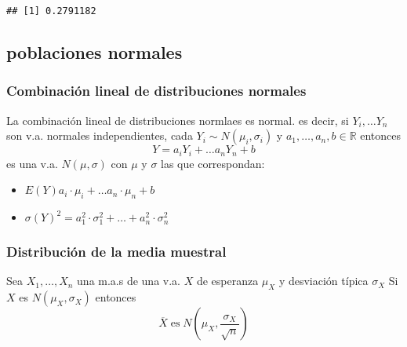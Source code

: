 \documentclass[
]{article}
\newenvironment{Shaded}{\begin{snugshade}}{\end{snugshade}}
\newcommand{\DecValTok}[1]{\textcolor[rgb]{0.00,0.00,0.81}{#1}}
\newcommand{\FunctionTok}[1]{\textcolor[rgb]{0.00,0.00,0.00}{#1}}
\newcommand{\NormalTok}[1]{#1}
\newcommand{\SpecialCharTok}[1]{\textcolor[rgb]{0.00,0.00,0.00}{#1}}
\begin{document}
\begin{Shaded}
\end{Shaded}

\begin{verbatim}
## [1] 0.2791182
\end{verbatim}

\hypertarget{poblaciones-normales}{%
\subsection{poblaciones normales}\label{poblaciones-normales}}

\hypertarget{combinaciuxf3n-lineal-de-distribuciones-normales}{%
\subsubsection{Combinación lineal de distribuciones
normales}\label{combinaciuxf3n-lineal-de-distribuciones-normales}}

La combinación lineal de distribuciones normlaes es normal. es decir, si
\(Y_i,\ldots Y_n\) son v.a. normales independientes, cada
\(Y_i \sim N(\mu_i,\sigma_i)\) y \(a_1,\ldots, a_n, b\in \mathbb{R}\)
entonces \[Y=a_iY_i + \ldots a_nY_n + b\] es una v.a. \(N(\mu,\sigma)\)
con \(\mu\) y \(\sigma\) las que correspondan:

\begin{itemize}
\item $E(Y)a_i\cdot \mu_i + \ldots a_n \cdot \mu_n + b$ 
\item $\sigma\left(Y\right)^2 = a_1^2 \cdot \sigma_1^2 + \ldots + a_n^2 \cdot \sigma_n^2$
\end{itemize}

\hypertarget{distribuciuxf3n-de-la-media-muestral}{%
\subsubsection{Distribución de la media
muestral}\label{distribuciuxf3n-de-la-media-muestral}}

Sea \(X_1, \ldots , X_n\) una m.a.s de una v.a. \(X\) de esperanza
\(\mu_X\) y desviación típica \(\sigma_X\) Si \(X\) es
\(N(\mu_X,\sigma_X)\) entonces
\[\overline{X} \;\mbox{es}\; N\left(\mu_X,\dfrac{\sigma_X}{\sqrt{n}}\right)\]
\end{document}
